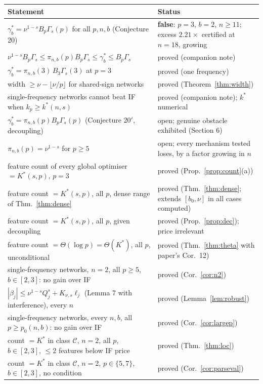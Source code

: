 \documentclass[11pt]{article}
\theoremstyle{definition}
\begin{document}
\begin{center}
\begin{tabular}{p{}p{}}
\toprule
Statement & Status\\
\midrule
$\gamma^*_b=\nu^{1-s}B_p\Gamma_s(p)$ for all $p,n,b$ (Conjecture 20) & \textbf{false}: $p=3$, $b=2$, $n\ge11$; excess
$2.21\times$ certified at $n=18$, growing\\
$\nu^{1-s}B_p\Gamma_s\le\pi_{n,b}(p)B_p\Gamma_s\le\gamma^*_b\le B_p\Gamma_s$ & proved (companion note)\\
$\gamma^*_b=\pi_{n,b}(3)\,B_3\Gamma_s(3)$ at $p=3$ & proved (one frequency)\\
width $\ge\nu-\lfloor\nu/p\rfloor$ for shared-sign networks & proved (Theorem~\ref{thm:width})\\
single-frequency networks cannot beat IF when $k_p\ge k^*(n,s)$ & proved (companion note); $k^*$ numerical\\
$\gamma^*_b=\pi_{n,b}(p)B_p\Gamma_s(p)$ (Conjecture 20$'$, decoupling) & open; genuine obstacle exhibited (Section 6)\\
$\pi_{n,b}(p)=\nu^{1-s}$ for $p\ge5$ & open; every mechanism tested loses, by a factor growing in $n$\\
\midrule
feature count of every global optimiser $=K^*(s,p)$, $p=3$ & proved (Prop.~\ref{prop:count}(a))\\
feature count $=K^*(s,p)$, all $p$, dense range of Thm.~\ref{thm:dense} & proved (Thm.~\ref{thm:dense}; extends $[b_0,\nu]$ in all cases computed)\\
feature count $=K^*(s,p)$, all $p$, given decoupling & proved (Prop.~\ref{prop:dec}); price irrelevant\\
feature count $=\Theta(\log p)=\Theta(K^*)$, all $p$, unconditional & proved (Thm.~\ref{thm:theta} with paper's Cor.~12)\\
single-frequency networks, $n=2$, all $p\ge5$, $b\in[2,3]$: no gain over IF & proved (Cor.~\ref{cor:n2})\\
$|\beta_j|\le\nu^{1-s}Q_j^s+K_{\nu,s}\ell_j$ (Lemma 7 with interference), every $n$ & proved (Lemma~\ref{lem:robust})\\
single-frequency networks, every $n,b$, all $p\ge p_0(n,b)$: no gain over IF & proved (Cor.~\ref{cor:largep})\\
count $=K^*$ in class $\mathcal C$, $n=2$, all $p$, $b\in[2,3]$, $\le2$ features below IF price & proved (Thm.~\ref{thm:loc})\\
count $=K^*$ in class $\mathcal C$, $n=2$, $p\in\{5,7\}$, $b\in[2,3]$, no condition & proved (Cor.~\ref{cor:parseval})\\

\end{tabular}
\end{center}
\end{document}
